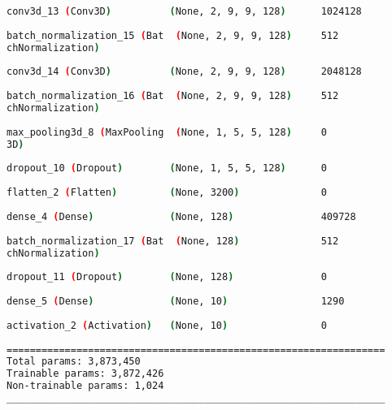 \begin{lstlisting}[language=Bash,caption={Overview of layers in 3D convolutional network},label={lst:3d_conv_layers},numbers=none,float=htb]
conv3d_13 (Conv3D)          (None, 2, 9, 9, 128)      1024128   
                                                                
batch_normalization_15 (Bat  (None, 2, 9, 9, 128)     512       
chNormalization)                                                
                                                                
conv3d_14 (Conv3D)          (None, 2, 9, 9, 128)      2048128   
                                                                
batch_normalization_16 (Bat  (None, 2, 9, 9, 128)     512       
chNormalization)                                                
                                                                
max_pooling3d_8 (MaxPooling  (None, 1, 5, 5, 128)     0         
3D)                                                             
                                                                
dropout_10 (Dropout)        (None, 1, 5, 5, 128)      0         
                                                                
flatten_2 (Flatten)         (None, 3200)              0         
                                                                
dense_4 (Dense)             (None, 128)               409728    
                                                                
batch_normalization_17 (Bat  (None, 128)              512       
chNormalization)                                                
                                                                
dropout_11 (Dropout)        (None, 128)               0         
                                                                
dense_5 (Dense)             (None, 10)                1290      
                                                                
activation_2 (Activation)   (None, 10)                0         
                                                                
=================================================================
Total params: 3,873,450
Trainable params: 3,872,426
Non-trainable params: 1,024
_________________________________________________________________
\end{lstlisting}

